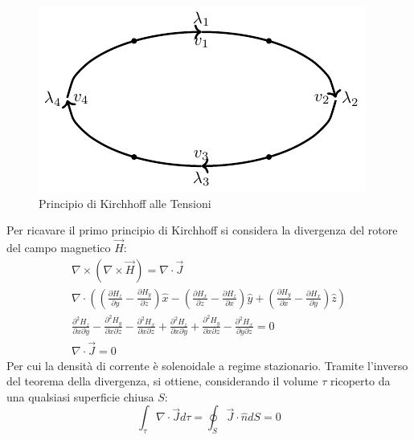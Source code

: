 \documentclass{article}
\numberwithin{equation}{subsection}
\begin{document}
\begin{figure}[H]%
    \centering
    \includegraphics{principio-kirchhoff-tensioni.pdf}
    \caption{Principio di Kirchhoff alle Tensioni}
    \label{fig:principio-kirchhoff-tensioni}
\end{figure}

Per ricavare il primo principio di Kirchhoff si considera la divergenza del rotore del campo magnetico $\vec{H}$:
\begin{gather*}
    \nabla\times(\nabla\times\vec{H})=\nabla\cdot\vec{J}\\
    \displaystyle\nabla\cdot\left(\displaystyle\left(\frac{\partial H_z}{\partial y}-\frac{\partial H_y}{\partial z}\right)\hat{x}-\left(\frac{\partial H_x}{\partial z}-\frac{\partial H_z}{\partial x}\right)\hat{y}+\left(\frac{\partial H_y}{\partial x}-\frac{\partial H_x}{\partial y}\right)\hat{z}\right)\\
    \displaystyle\frac{\partial^2H_z}{\partial x\partial y}-\frac{\partial^2H_y}{\partial x\partial z}-\frac{\partial^2H_x}{\partial x\partial z}+\frac{\partial^2H_z}{\partial x\partial y}+\frac{\partial^2 H_y}{\partial x\partial z}-\frac{\partial^2H_x}{\partial y\partial z}=0\\
    \nabla\cdot\vec{J}=0
\end{gather*}
Per cui la densità di corrente è solenoidale a regime stazionario. Tramite l'inverso del teorema della divergenza, si ottiene, considerando il volume $\tau$ ricoperto da una 
qualsiasi superficie chiusa $S$:
\begin{equation*}
    \displaystyle\int_{\tau}\nabla\cdot\vec{J}d\tau=\oint_{S}\vec{J}\cdot\hat{n}dS=0
\end{equation*}
\end{document}
